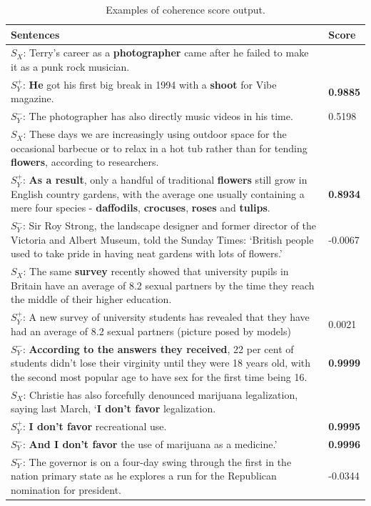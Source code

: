 \documentclass[letterpaper]{article} %
\begin{document}
	\begin{table}[ht]
		\centering
		\caption{Examples of coherence score output.}
		\label{tab:coherence_examples}

		\begin{tabular}{|p{65mm}|p{11mm}|}
			\hline
			 \centering Sentences &  Score \\\hline
			$S_X$: \small{Terry's career as a \textbf{photographer} came after he failed to make it as a punk rock musician.} & \\
			$S_Y^+$: \small{\textbf{He} got his first big break in 1994 with a \textbf{shoot} for Vibe magazine.} & \textbf{0.9885} \\
			$S_Y^-$: \small{The photographer has also directly music videos in his time.} & 0.5198 \\
			\hline
			$S_X$: \small{These days we are increasingly using outdoor space for the occasional barbecue or to relax in a hot tub rather than for tending \textbf{flowers}, according to researchers.} & \\
			$S_Y^+$: \small{\textbf{As a result}, only a handful of traditional \textbf{flowers} still grow in English country gardens, with the average one usually containing a mere four species - \textbf{daffodils}, \textbf{crocuses}, \textbf{roses} and \textbf{tulips}.} & \textbf{0.8934} \\
			$S_Y^-$: \small{Sir Roy Strong, the landscape designer and former director of the Victoria and Albert Museum, told the Sunday Times: `British people used to take pride in having neat gardens with lots of flowers.'} & -0.0067 \\
			\hline
			$S_X$: \small{The same \textbf{survey} recently showed that university pupils in Britain have an average of 8.2 sexual partners by the time they reach the middle of their higher education.} & \\
			$S_Y^+$: \small{A new survey of university students has revealed that they have had an average of 8.2 sexual partners (picture posed by models)} & 0.0021 \\
			$S_Y^-$: \small{\textbf{According to the answers they received}, 22 per cent of students didn't lose their virginity until they were 18 years old, with the second most popular age to have sex for the first time being 16. } & \textbf{0.9999} \\
			\hline
			$S_X$: \small{Christie has also forcefully denounced marijuana legalization, saying last March, `\textbf{I don't favor} legalization.} & \\
			$S_Y^+$: \small{\textbf{I don't favor} recreational use.} &\textbf{0.9995} \\
			$S_Y^-$: \small{\textbf{And I don't favor} the use of marijuana as a medicine.'} & \textbf{0.9996} \\
			$S_Y^-$: \small{The governor is on a four-day swing through the first in the nation primary state as he explores a run for the Republican nomination for president.} & -0.0344 \\
			\hline
		\end{tabular}
	\end{table}
	
\end{document}
